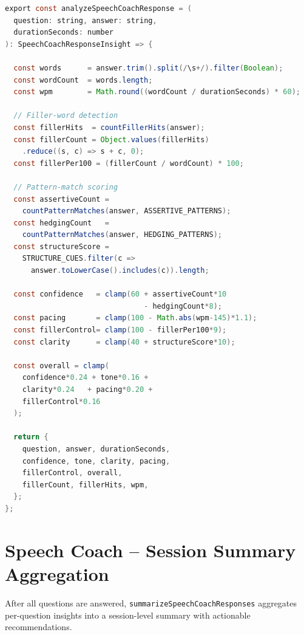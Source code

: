 \begin{lstlisting}[language=Java,
  caption={Per-response speech-coach analysis
           (\texttt{lib/speech/coach.ts})},
  label={lst:speechCoach}]
export const analyzeSpeechCoachResponse = (
  question: string, answer: string,
  durationSeconds: number
): SpeechCoachResponseInsight => {

  const words      = answer.trim().split(/\s+/).filter(Boolean);
  const wordCount  = words.length;
  const wpm        = Math.round((wordCount / durationSeconds) * 60);

  // Filler-word detection
  const fillerHits  = countFillerHits(answer);
  const fillerCount = Object.values(fillerHits)
    .reduce((s, c) => s + c, 0);
  const fillerPer100 = (fillerCount / wordCount) * 100;

  // Pattern-match scoring
  const assertiveCount =
    countPatternMatches(answer, ASSERTIVE_PATTERNS);
  const hedgingCount   =
    countPatternMatches(answer, HEDGING_PATTERNS);
  const structureScore =
    STRUCTURE_CUES.filter(c =>
      answer.toLowerCase().includes(c)).length;

  const confidence   = clamp(60 + assertiveCount*10
                                - hedgingCount*8);
  const pacing       = clamp(100 - Math.abs(wpm-145)*1.1);
  const fillerControl= clamp(100 - fillerPer100*9);
  const clarity      = clamp(40 + structureScore*10);

  const overall = clamp(
    confidence*0.24 + tone*0.16 +
    clarity*0.24   + pacing*0.20 +
    fillerControl*0.16
  );

  return {
    question, answer, durationSeconds,
    confidence, tone, clarity, pacing,
    fillerControl, overall,
    fillerCount, fillerHits, wpm,
  };
};
\end{lstlisting}

\section{Speech Coach -- Session Summary Aggregation}
\label{app:speech-summary}

After all questions are answered, \texttt{summarizeSpeechCoachResponses}
aggregates per-question insights into a session-level summary with actionable
recommendations.

